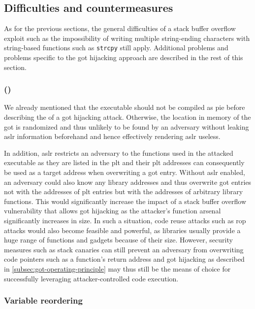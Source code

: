 \subsection{Difficulties and countermeasures}
\label{subsec:got-countermeasures}

As for the previous sections, the general difficulties of a stack buffer overflow exploit such as the impossibility of writing multiple string-ending characters with string-based functions such as \texttt{strcpy} still apply.
Additional problems and problems specific to the \gls{got} hijacking approach are described in the rest of this section.

\subsubsection{ ()}
\label{subsubsec:got-aslr}

We already mentioned that the executable should not be compiled as \gls{pie} before describing the  of a \gls{got} hijacking attack.
Otherwise, the location in memory of the \gls{got} is randomized and thus unlikely to be found by an adversary without leaking \gls{aslr} information beforehand and hence effectively rendering \gls{aslr} useless.

In addition, \gls{aslr} restricts an adversary to the functions used in the attacked executable as they are listed in the \gls{plt} and their \gls{plt} addresses can consequently be used as a target address when overwriting a \gls{got} entry.
Without \gls{aslr} enabled, an adversary could also know any library addresses and thus overwrite \gls{got} entries not with the addresses of \gls{plt} entries but with the addresses of arbitrary library functions.
This would significantly increase the impact of a stack buffer overflow vulnerability that allows \gls{got} hijacking as the attacker's function arsenal significantly increases in size.
In such a situation, code reuse attacks such as \gls{rop} attacks would also become feasible and powerful, as libraries usually provide a huge range of functions and gadgets because of their size.
However, security measures such as stack canaries can still prevent an adversary from overwriting code pointers such as a function's return address and \gls{got} hijacking as described in \cref{subsec:got-operating-principle} may thus still be the means of choice for successfully leveraging attacker-controlled code execution.

\subsubsection{Variable reordering}
\label{subsubsec:got-variable-reordering}


